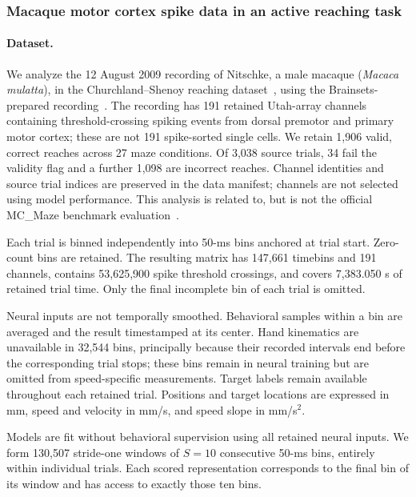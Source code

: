 \subsubsection{Macaque motor cortex spike data in an active reaching task}
\label{subsubsection:churchland_results_additional}

\paragraph{Dataset.}
We analyze the 12 August 2009 recording of Nitschke, a male macaque (\textit{Macaca mulatta}), in the Churchland--Shenoy reaching dataset~\citep{churchland_2012_population_dynamics}, using the Brainsets-prepared recording~\citep{azabou_2023_unified}. The recording has 191 retained Utah-array channels containing threshold-crossing spiking events from dorsal premotor and primary motor cortex; these are not 191 spike-sorted single cells. We retain 1,906 valid, correct reaches across 27 maze conditions. Of 3,038 source trials, 34 fail the validity flag and a further 1,098 are incorrect reaches. Channel identities and source trial indices are preserved in the data manifest; channels are not selected using model performance. This analysis is related to, but is not the official MC\_Maze benchmark evaluation~\citep{nlb_mcmaze}.

Each trial is binned independently into 50-ms bins anchored at trial start. Zero-count bins are retained. The resulting matrix has 147,661 timebins and 191 channels, contains 53,625,900 spike threshold crossings, and covers 7,383.050 s of retained trial time. Only the final incomplete bin of each trial is omitted. 

Neural inputs are not temporally smoothed. Behavioral samples within a bin are averaged and the result timestamped at its center. Hand kinematics are unavailable in 32,544 bins, principally because their recorded intervals end before the corresponding trial stops; these bins remain in neural training but are omitted from speed-specific measurements. Target labels remain available throughout each retained trial. Positions and target locations are expressed in mm, speed and velocity in mm/s, and speed slope in mm/s$^2$.

Models are fit without behavioral supervision using all retained neural inputs. We form 130,507 stride-one windows of $S=10$ consecutive 50-ms bins, entirely within individual trials. Each scored representation corresponds to the final bin of its window and has access to exactly those ten bins.

